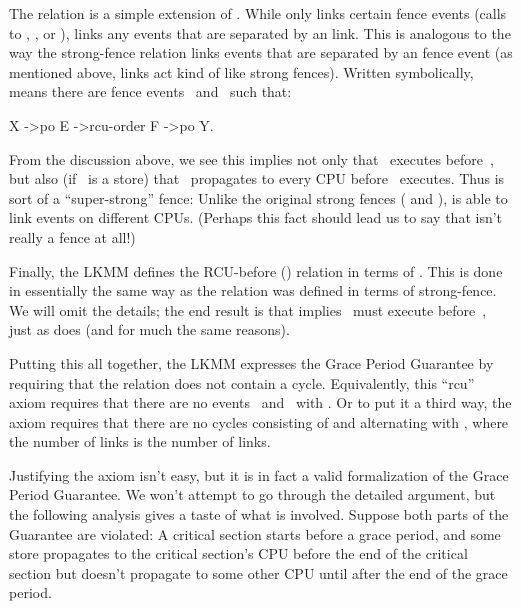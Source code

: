 The  relation is a simple extension of .
While  only links certain fence events (calls to
, , or ),
 links any events that are separated by an  link.
This is analogous to the way the strong-fence relation links events
that are separated by an  fence event (as mentioned above,
 links act kind of like strong fences).
Written symbolically,  means there are fence
events~ and~ such that:

\begin{VerbatimU}
	X ->po E ->rcu-order F ->po Y.
\end{VerbatimU}

From the discussion above, we see this implies not only that
~executes before~, but also (if ~is a store)
that ~propagates to every CPU before ~executes.
Thus  is sort of a ``super-strong'' fence:
Unlike the original strong fences ( and ),
 is able to link events on different CPUs.
(Perhaps this fact should lead us to say that  isn't
really a fence at all!)

Finally, the LKMM defines the RCU-before () relation in terms of
.
This is done in essentially the same way as the  relation was
defined in terms of strong-fence.
We will omit the details; the end result is that 
implies ~must execute before~, just as 
does (and for much the same reasons).

Putting this all together, the LKMM expresses the Grace Period
Guarantee by requiring that the  relation does not contain a cycle.
Equivalently, this ``rcu'' axiom requires that there are no events~
and~ with .
Or to put it a third way, the axiom requires that there are no cycles
consisting of  and  alternating with
, where the number of  links is \co{>=} the
number of  links.

Justifying the axiom isn't easy, but it is in fact a valid
formalization of the Grace Period Guarantee.
We won't attempt to go through the detailed argument, but the
following analysis gives a taste of what is involved.
Suppose both parts of the Guarantee are violated:
A critical section starts before a grace period, and some store
propagates to the critical section's CPU before the end of the
critical section but doesn't propagate to some other CPU until after
the end of the grace period.


